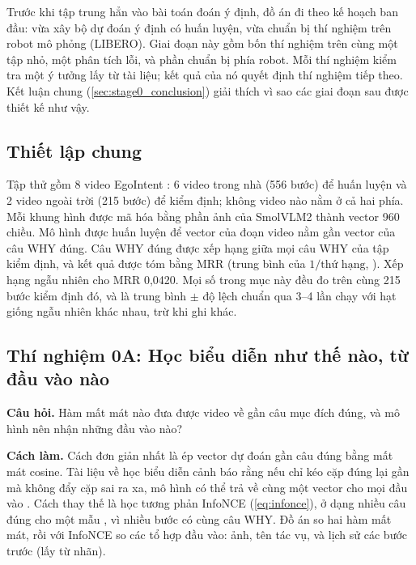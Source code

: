\documentclass[a4paper,oneside]{report}
\begin{document}
Trước khi tập trung hẳn vào bài toán đoán ý định, đồ án đi theo kế hoạch ban đầu: vừa xây bộ dự đoán ý định có huấn luyện, vừa chuẩn bị thí nghiệm trên robot mô phỏng (LIBERO). Giai đoạn này gồm bốn thí nghiệm trên cùng một tập nhỏ, một phân tích lỗi, và phần chuẩn bị phía robot. Mỗi thí nghiệm kiểm tra một ý tưởng lấy từ tài liệu; kết quả của nó quyết định thí nghiệm tiếp theo. Kết luận chung (\cref{sec:stage0_conclusion}) giải thích vì sao các giai đoạn sau được thiết kế như vậy.

\subsection{Thiết lập chung}

Tập thử gồm 8 video EgoIntent \citep{egointent2026}: 6 video trong nhà (556 bước) để huấn luyện và 2 video ngoài trời (215 bước) để kiểm định; không video nào nằm ở cả hai phía. Mỗi khung hình được mã hóa bằng phần ảnh của SmolVLM2 \citep{marafioti2025smolvlm} thành vector 960 chiều. Mô hình được huấn luyện để vector của đoạn video nằm gần vector của câu WHY đúng. Câu WHY đúng được xếp hạng giữa mọi câu WHY của tập kiểm định, và kết quả được tóm bằng MRR (trung bình của $1/\text{thứ hạng}$, \citealp{voorhees1999trec}). Xếp hạng ngẫu nhiên cho MRR 0,0420. Mọi số trong mục này đều đo trên cùng 215 bước kiểm định đó, và là trung bình $\pm$ độ lệch chuẩn qua 3--4 lần chạy với hạt giống ngẫu nhiên khác nhau, trừ khi ghi khác.

\subsection{Thí nghiệm 0A: Học biểu diễn như thế nào, từ đầu vào nào}

\textbf{Câu hỏi.} Hàm mất mát nào đưa được video về gần câu mục đích đúng, và mô hình nên nhận những đầu vào nào?

\textbf{Cách làm.} Cách đơn giản nhất là ép vector dự đoán gần câu đúng bằng mất mát cosine. Tài liệu về học biểu diễn cảnh báo rằng nếu chỉ kéo cặp đúng lại gần mà không đẩy cặp sai ra xa, mô hình có thể trả về cùng một vector cho mọi đầu vào \citep{wang2020uniformity}. Cách thay thế là học tương phản InfoNCE \citep{oord2018cpc} (\cref{eq:infonce}), ở dạng nhiều câu đúng cho một mẫu \citep{khosla2020supcon}, vì nhiều bước có cùng câu WHY. Đồ án so hai hàm mất mát, rồi với InfoNCE so các tổ hợp đầu vào: ảnh, tên tác vụ, và lịch sử các bước trước (lấy từ nhãn).
\end{document}
